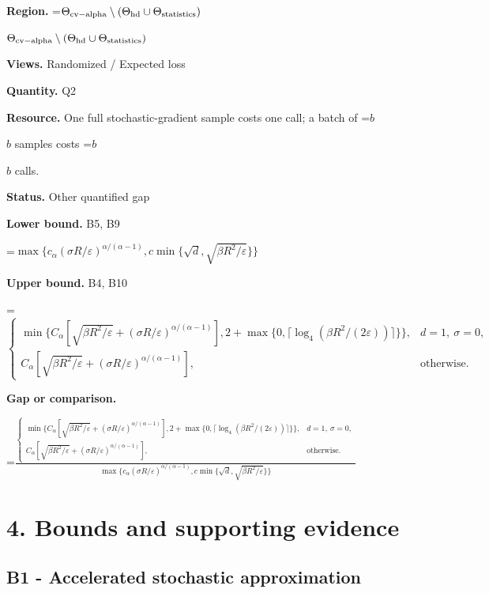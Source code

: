 \documentclass[10pt,a4paper]{article}
\newcommand{\AtlasMath}[1]{\par\begingroup\centering\setbox0=\hbox{$\displaystyle #1$}\ifdim\wd0>1.4\linewidth\typeout{ATLAS WIDE FORMULA: \the\wd0}\fi\ifdim\wd0>\linewidth\resizebox{\linewidth}{!}{\box0}\else\box0\fi\par\endgroup}
\newcommand{\AtlasInlineMath}[1]{\begingroup\setbox0=\hbox{$#1$}\ifdim\wd0>.4\linewidth\endgroup\AtlasMath{#1}\else\endgroup$#1$\fi}
\begin{document}
\textbf{Region.} \AtlasInlineMath{\Theta_{\rm cv-alpha}\setminus(\Theta_{\rm hd}\cup\Theta_{\rm statistics})}



\textbf{Views.} Randomized / Expected loss



\textbf{Quantity.} Q2



\textbf{Resource.} One full stochastic-gradient sample costs one call; a batch of \AtlasInlineMath{b} samples costs \AtlasInlineMath{b} calls.



\textbf{Status.} Other quantified gap



\textbf{Lower bound.} B5, B9



\AtlasMath{\max\{c_\alpha (\sigma R/\varepsilon)^{\alpha/(\alpha-1)},c\min\{\sqrt d,\sqrt{\beta R^2/\varepsilon}\}\}}


\textbf{Upper bound.} B4, B10



\AtlasMath{\begin{cases}\min\{C_\alpha[\sqrt{\beta R^2/\varepsilon}+(\sigma R/\varepsilon)^{\alpha/(\alpha-1)}],2+\max\{0,\lceil\log_4(\beta R^2/(2\varepsilon))\rceil\}\},&d=1,\ \sigma=0,\\C_\alpha[\sqrt{\beta R^2/\varepsilon}+(\sigma R/\varepsilon)^{\alpha/(\alpha-1)}],&\text{otherwise}.\end{cases}}


\textbf{Gap or comparison.}
\AtlasMath{\frac{\begin{cases}\min\{C_\alpha[\sqrt{\beta R^2/\varepsilon}+(\sigma R/\varepsilon)^{\alpha/(\alpha-1)}],2+\max\{0,\lceil\log_4(\beta R^2/(2\varepsilon))\rceil\}\},&d=1,\ \sigma=0,\\C_\alpha[\sqrt{\beta R^2/\varepsilon}+(\sigma R/\varepsilon)^{\alpha/(\alpha-1)}],&\text{otherwise}.\end{cases}}{\max\{c_\alpha (\sigma R/\varepsilon)^{\alpha/(\alpha-1)},c\min\{\sqrt d,\sqrt{\beta R^2/\varepsilon}\}\}}}




\section{4. Bounds and supporting evidence}


\subsection{B1 - Accelerated stochastic approximation}
\end{document}
